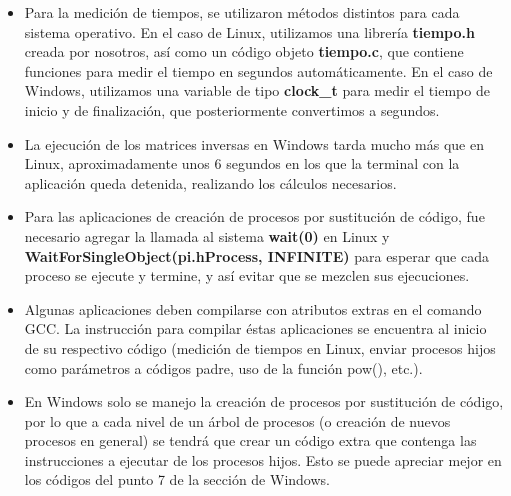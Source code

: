 \documentclass[12pt]{article}
\begin{document}
\begin{itemize}
            \item[\Checkmark] Para la medición de tiempos, se utilizaron métodos distintos para cada sistema operativo. En el caso de Linux, utilizamos una librería \textbf{tiempo.h} creada por nosotros, así como un código objeto \textbf{tiempo.c}, que contiene funciones para medir el tiempo en segundos automáticamente. En el caso de Windows, utilizamos una variable de tipo \textbf{clock\_t} para medir el tiempo de inicio y de finalización, que posteriormente convertimos a segundos.
            
            \item[\Checkmark] La ejecución de los matrices inversas en Windows tarda mucho más que en Linux, aproximadamente unos 6 segundos en los que la terminal con la aplicación queda detenida, realizando los cálculos necesarios.
            
            \item[\Checkmark] Para las aplicaciones de creación de procesos por sustitución de código, fue necesario agregar la llamada al sistema \textbf{wait(0)} en Linux y \textbf{WaitForSingleObject(pi.hProcess, INFINITE)} para esperar que cada proceso se ejecute y termine, y así evitar que se mezclen sus ejecuciones.
            
            \item[\Checkmark] Algunas aplicaciones deben compilarse con atributos extras en el comando GCC. La instrucción para compilar éstas aplicaciones se encuentra al inicio de su respectivo código (medición de tiempos en Linux, enviar procesos hijos como parámetros a códigos padre, uso de la función pow(), etc.).
            
            \item[\Checkmark] En Windows solo se manejo la creación de procesos por sustitución de código, por lo que a cada nivel de un árbol de procesos (o creación de nuevos procesos en general) se tendrá que crear un código extra que contenga las instrucciones a ejecutar de los procesos hijos. Esto se puede apreciar mejor en los códigos del punto 7 de la sección de Windows.
            
        \end{itemize}

\end{document}
